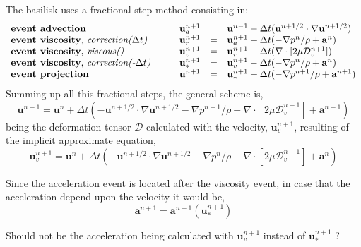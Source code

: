 \documentclass[a4paper]{report}
\begin{document}
The basilisk uses a fractional step method consisting in:
\begin{equation}
\begin{array}{lcrcl}
\mbox{\textbf{event advection}} &  \quad &  \mathbf{u}^{n+1}_a    & = & \mathbf{u}^{n-1} - \Delta t (\mathbf{u}^{n+1/2} \cdot \nabla \mathbf{u}^{n+1/2})  \\
\mbox{\textbf{event viscosity}, \emph{correction($\Delta t$)}} & \quad & \mathbf{u}^{n+1}_r   & = & \mathbf{u}^{n+1}_a + \Delta t (-\nabla p^n/\rho + \mathbf{a}^{n})  \\
\mbox{\textbf{event viscosity}, \emph{viscous()}} & \quad & \mathbf{u}^{n+1}_v   & = & \mathbf{u}^{n+1}_r + \Delta t (\nabla \cdot [2 \mu \mathcal{D}^{n+1}_v])  \\
\mbox{\textbf{event viscosity}, \emph{correction(-$\Delta t$)}} & \quad & \mathbf{u}^{n+1}_*   & = & \mathbf{u}^{n+1}_v - \Delta t (-\nabla p^n/\rho + \mathbf{a}^{n})  \\
\mbox{\textbf{event projection}} & \quad & \mathbf{u}^{n+1}   & = & \mathbf{u}^{n+1}_* + \Delta t (-\nabla p^{n+1}/\rho + \mathbf{a}^{n+1})  \\
\end{array}
\end{equation}
Summing up all this fractional steps, the general scheme is,
\begin{equation}
\mathbf{u}^{n+1}  =  \mathbf{u}^{n} + \Delta t (-\mathbf{u}^{n+1/2} \cdot \nabla \mathbf{u}^{n+1/2}-\nabla p^{n+1}/\rho + \nabla \cdot [2 \mu \mathcal{D}^{n+1}_v] + \mathbf{a}^{n+1})
\end{equation}
being the deformation tensor $\mathcal{D}$ calculated with the velocity, $\mathbf{u}_v^{n+1}$, resulting of the implicit approximate equation,
\begin{equation}
\mathbf{u}_v^{n+1}  =  \mathbf{u}^{n} + \Delta t (-\mathbf{u}^{n+1/2} \cdot \nabla \mathbf{u}^{n+1/2}-\nabla p^{n}/\rho + \nabla \cdot [2 \mu \mathcal{D}^{n+1}_v] + \mathbf{a}^{n})
\end{equation}

Since the acceleration event is located after the viscosity event, in case that the acceleration depend upon the velocity it would be,
$$
\mathbf{a}^{n+1} = \mathbf{a}^{n+1} (\mathbf{u}_*^{n+1})
$$

{\color{red} Should not be the acceleration being calculated with $\mathbf{u}_v^{n+1}$ instead of $\mathbf{u}_*^{n+1}$ ? }
\end{document}
